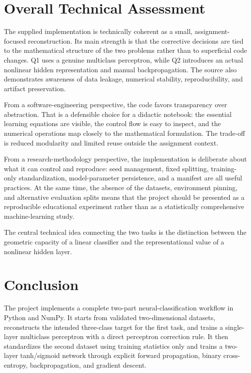 \documentclass[11pt,a4paper]{article}
\begin{document}
\section{Overall Technical Assessment}
The supplied implementation is technically coherent as a small, assignment-focused reconstruction. Its main strength is that the corrective decisions are tied to the mathematical structure of the two problems rather than to superficial code changes. Q1 uses a genuine multiclass perceptron, while Q2 introduces an actual nonlinear hidden representation and manual backpropagation. The source also demonstrates awareness of data leakage, numerical stability, reproducibility, and artifact preservation.

From a software-engineering perspective, the code favors transparency over abstraction. That is a defensible choice for a didactic notebook: the essential learning equations are visible, the control flow is easy to inspect, and the numerical operations map closely to the mathematical formulation. The trade-off is reduced modularity and limited reuse outside the assignment context.

From a research-methodology perspective, the implementation is deliberate about what it can control and reproduce: seed management, fixed splitting, training-only standardization, model-parameter persistence, and a manifest are all useful practices. At the same time, the absence of the datasets, environment pinning, and alternative evaluation splits means that the project should be presented as a reproducible educational experiment rather than as a statistically comprehensive machine-learning study.

The central technical idea connecting the two tasks is the distinction between the geometric capacity of a linear classifier and the representational value of a nonlinear hidden layer.

\section{Conclusion}
The project implements a complete two-part neural-classification workflow in Python and NumPy. It starts from validated two-dimensional datasets, reconstructs the intended three-class target for the first task, and trains a single-layer multiclass perceptron with a direct perceptron correction rule. It then standardizes the second dataset using training statistics only and trains a two-layer tanh/sigmoid network through explicit forward propagation, binary cross-entropy, backpropagation, and gradient descent.
\end{document}
